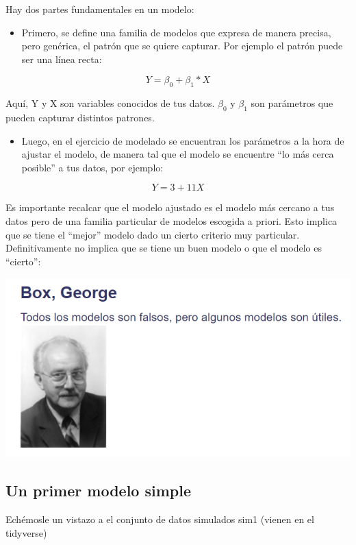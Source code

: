 \documentclass[]{book}
\providecommand{\tightlist}{%
  \setlength{\itemsep}{0pt}\setlength{\parskip}{0pt}}
\theoremstyle{definition}
\theoremstyle{definition}
\theoremstyle{definition}
\theoremstyle{remark}
\begin{document}
Hay dos partes fundamentales en un modelo:

\begin{itemize}
\tightlist
\item
  Primero, se define una familia de modelos que expresa de manera
  precisa, pero genérica, el patrón que se quiere capturar. Por ejemplo
  el patrón puede ser una línea recta:
\end{itemize}

\[ Y = \beta_{0} + \beta_{1}*X \]

Aquí, Y y X son variables conocidos de tus datos. \(\beta_{0}\) y
\(\beta_{1}\) son parámetros que pueden capturar distintos patrones.

\begin{itemize}
\tightlist
\item
  Luego, en el ejercicio de modelado se encuentran los parámetros a la
  hora de ajustar el modelo, de manera tal que el modelo se encuentre
  ``lo más cerca posible'' a tus datos, por ejemplo:
\end{itemize}

\[ Y = 3 + 11X \]

Es importante recalcar que el modelo ajustado es el modelo más cercano a
tus datos pero de una familia particular de modelos escogida a priori.
Esto implica que se tiene el ``mejor'' modelo dado un cierto criterio
muy particular. Definitivamente no implica que se tiene un buen modelo o
que el modelo es ``cierto'':

\includegraphics[width=8.85in]{./imagenes/box}

\subsection{Un primer modelo simple}\label{un-primer-modelo-simple}

Echémosle un vistazo a el conjunto de datos simulados sim1 (vienen en el
tidyverse)
\end{document}
